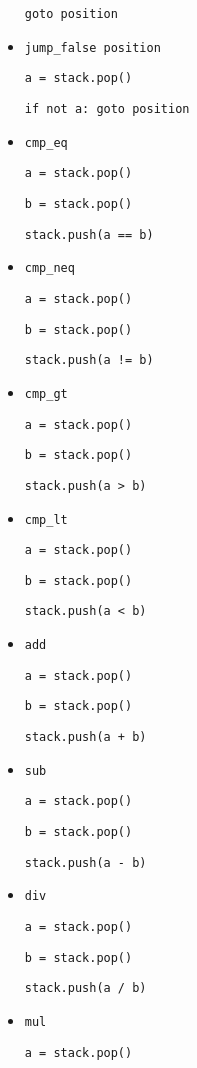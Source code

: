 \begin{itemize}
  \texttt{goto position}

\item \texttt{jump\_false position}

  \texttt{a = stack.pop()}

  \texttt{if not a: goto position}

\item \texttt{cmp\_eq}

  \texttt{a = stack.pop()}

  \texttt{b = stack.pop()}

  \texttt{stack.push(a == b)}

\item \texttt{cmp\_neq}

  \texttt{a = stack.pop()}

  \texttt{b = stack.pop()}

  \texttt{stack.push(a != b)}

\item \texttt{cmp\_gt}

  \texttt{a = stack.pop()}

  \texttt{b = stack.pop()}

  \texttt{stack.push(a > b)}

\item \texttt{cmp\_lt}

  \texttt{a = stack.pop()}

  \texttt{b = stack.pop()}

  \texttt{stack.push(a < b)}

\item \texttt{add}

  \texttt{a = stack.pop()}

  \texttt{b = stack.pop()}

  \texttt{stack.push(a + b)}

\item \texttt{sub}

  \texttt{a = stack.pop()}

  \texttt{b = stack.pop()}

  \texttt{stack.push(a - b)}

\item \texttt{div}
  
  \texttt{a = stack.pop()}

  \texttt{b = stack.pop()}

  \texttt{stack.push(a / b)}

\item \texttt{mul}

  \texttt{a = stack.pop()}


\end{itemize}
